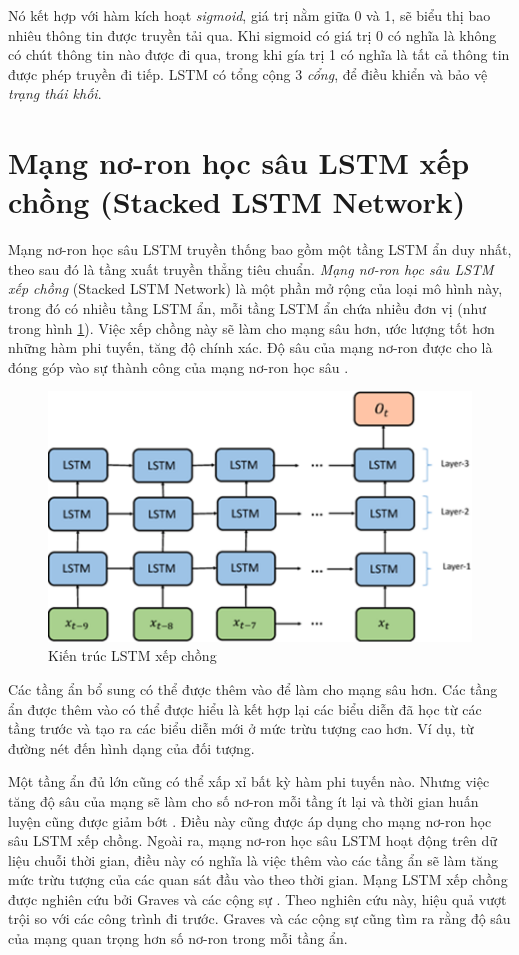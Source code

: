 Nó kết hợp với hàm kích hoạt \textit{sigmoid}, giá trị nằm giữa 0 và 1, sẽ biểu thị bao nhiêu thông tin được truyền tải qua. Khi sigmoid có giá trị 0 có nghĩa là không có chút thông tin nào được đi qua, trong khi gía trị 1 có nghĩa là tất cả thông tin được phép truyền đi tiếp. LSTM có tổng cộng 3 \textit{cổng}, để điều khiển và bảo vệ \textit{trạng thái khối}.

\section{Mạng nơ-ron học sâu LSTM xếp chồng (Stacked LSTM Network)}
Mạng nơ-ron học sâu LSTM truyền thống bao gồm một tầng LSTM ẩn duy nhất, theo sau đó là tầng xuất truyền thẳng tiêu chuẩn. \textit{Mạng nơ-ron học sâu LSTM xếp chồng} (Stacked LSTM Network) là một phần mở rộng của loại mô hình này, trong đó có nhiều tầng LSTM ẩn, mỗi tầng LSTM ẩn chứa nhiều đơn vị (như trong hình \ref{fig:2-10}). Việc xếp chồng này sẽ làm cho mạng sâu hơn, ước lượng tốt hơn những hàm phi tuyến, tăng độ chính xác. Độ sâu của mạng nơ-ron được cho là đóng góp vào sự thành công của mạng nơ-ron học sâu \cite{st19}.

\begin{figure}[ht]
    \centering
    \includegraphics[scale=0.7]{./content/images/2-10.png}
    \caption{Kiến trúc LSTM xếp chồng}
    \label{fig:2-10}
\end{figure}

Các tầng ẩn bổ sung có thể được thêm vào để làm cho mạng sâu hơn. Các tầng ẩn được thêm vào có thể được hiểu là kết hợp lại các biểu diễn đã học từ các tầng trước và tạo ra các biểu diễn mới ở mức trừu tượng cao hơn. Ví dụ, từ đường nét đến hình dạng
của đối tượng.

Một tầng ẩn đủ lớn cũng có thể xấp xỉ bất kỳ hàm phi tuyến nào. Nhưng việc tăng độ sâu của mạng sẽ làm cho số nơ-ron mỗi tầng ít lại và thời gian huấn luyện cũng được giảm bớt \cite{st20}. Điều này cũng được áp dụng cho mạng nơ-ron học sâu LSTM xếp chồng. Ngoài ra, mạng nơ-ron học sâu LSTM hoạt động trên dữ liệu chuỗi thời gian, điều này
có nghĩa là việc thêm vào các tầng ẩn sẽ làm tăng mức trừu tượng của các quan sát đầu vào theo thời gian. Mạng LSTM xếp chồng được nghiên cứu bởi Graves và các cộng sự \cite{st21}. Theo nghiên cứu này, hiệu quả vượt trội so với các công trình đi trước. Graves và các cộng sự cũng tìm ra rằng độ sâu của mạng quan trọng hơn số nơ-ron trong mỗi tầng ẩn.

